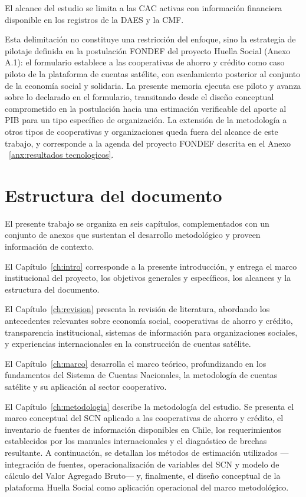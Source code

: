 El alcance del estudio se limita a las CAC activas con información financiera disponible en los registros de la DAES y la CMF. 

Esta delimitación no constituye una restricción del enfoque, sino la estrategia de pilotaje definida en la postulación FONDEF del proyecto Huella Social (Anexo A.1): el formulario establece a las cooperativas de ahorro y crédito como caso piloto de la plataforma de cuentas satélite, con escalamiento posterior al conjunto de la economía social y solidaria. La presente memoria ejecuta ese piloto y avanza sobre lo declarado en el formulario, transitando desde el diseño conceptual comprometido en la postulación hacia una estimación verificable del aporte al PIB para un tipo específico de organización. La extensión de la metodología a otros tipos de cooperativas y organizaciones queda fuera del alcance de este trabajo, y corresponde a la agenda del proyecto FONDEF descrita en el Anexo ~\ref{anx:resultados tecnologicos}.
 
\section{Estructura del documento}
 
 
El presente trabajo se organiza en seis capítulos, complementados con un conjunto de anexos que sustentan el desarrollo metodológico y proveen información de contexto.
 
El Capítulo~\ref{ch:intro} corresponde a la presente introducción, y entrega el marco institucional del proyecto, los objetivos generales y específicos, los alcances y la estructura del documento.
 
El Capítulo~\ref{ch:revision} presenta la revisión de literatura, abordando los antecedentes relevantes sobre economía social, cooperativas de ahorro y crédito, transparencia institucional, sistemas de información para organizaciones sociales, y experiencias internacionales en la construcción de cuentas satélite.
 
El Capítulo~\ref{ch:marco} desarrolla el marco teórico, profundizando en los fundamentos del Sistema de Cuentas Nacionales, la metodología de cuentas satélite y su aplicación al sector cooperativo.
 
El Capítulo~\ref{ch:metodologia} describe la metodología del estudio. Se presenta el marco conceptual del SCN aplicado a las cooperativas de ahorro y crédito, el inventario de fuentes de información disponibles en Chile, los requerimientos establecidos por los manuales internacionales y el diagnóstico de brechas resultante. A continuación, se detallan los métodos de estimación utilizados —integración de fuentes, operacionalización de variables del SCN y modelo de cálculo del Valor Agregado Bruto— y, finalmente, el diseño conceptual de la plataforma Huella Social como aplicación operacional del marco metodológico.
 
